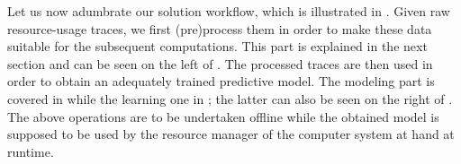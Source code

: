 Let us now adumbrate our solution workflow, which is illustrated in
. Given raw resource-usage traces, we first (pre)process them in
order to make these data suitable for the subsequent computations. This part is
explained in the next section and can be seen on the left of .
The processed traces are then used in order to obtain an adequately trained
predictive model. The modeling part is covered in  while the
learning one in ; the latter can also be seen on the right of
. The above operations are to be undertaken offline while the
obtained model is supposed to be used by the resource manager of the computer
system at hand at runtime.
